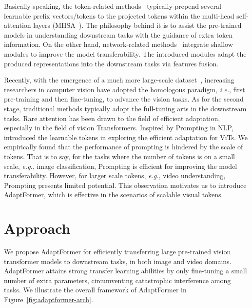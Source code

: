 Basically speaking, the token-related methods~\cite{lester-2021-nlpprompt,li-2021-prefix} typically prepend several learnable preﬁx vectors/tokens to the projected tokens within the multi-head self-attention layers (MHSA~\cite{vaswani-nips17-transformer}). The philosophy behind it is to assist the pre-trained models in understanding downstream tasks with the guidance of extra token information. On the other hand, network-related methods~\cite{houlsby-2019-adapternlp,hu-2021-lora} integrate shallow modules to improve the model transferability. The introduced modules adapt the produced representations into the downstream tasks via features fusion.

Recently, with the emergence of a much more large-scale dataset~\cite{deng-cvpr09-imagenet,ridnik-2021-imagenet21k,sun-iccv17-jfm,mahajan-eccv18-instagram,kay-2017-k400}, increasing researchers in computer vision have adopted the homologous paradigm, \emph{i.e.}, first pre-training and then fine-tuning, to advance the vision tasks. As for the second stage, traditional methods typically adopt the full-tuning arts in the downstream tasks. Rare attention has been drawn to the field of efficient adaptation, especially in the field of vision Transformers. Inspired by Prompting in NLP, ~\cite{jia-2022-vpt} introduced the learnable tokens in exploring the efficient adaptation for ViTs. We empirically found that the performance of prompting is hindered by the scale of tokens. That is to say, for the tasks where the number of tokens is on a small scale, \emph{e.g.}, image classification, Prompting is efficient for improving the model transferability. However, for larger scale tokens, \emph{e.g.}, video understanding, Prompting presents limited potential. This observation motivates us to introduce AdaptFormer, which is effective in the scenarios of scalable visual tokens.

\section{Approach}

We propose AdaptFormer for efficiently transferring large pre-trained vision transformer models to downstream tasks, in both image and video domains. AdaptFormer attains strong transfer learning abilities by only fine-tuning a small number of extra parameters, circumventing catastrophic interference among tasks. We illustrate the overall framework of AdaptFormer in Figure~\ref{fig:adaptformer-arch}.

